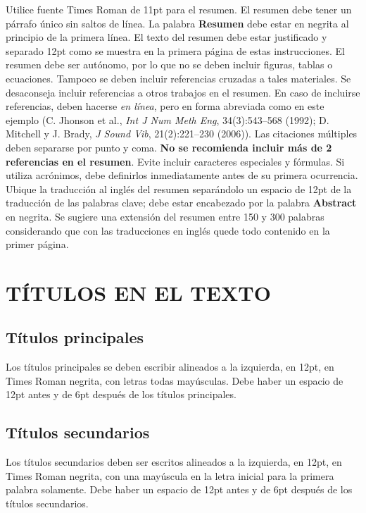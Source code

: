 \documentclass[oneside,a4paper,spanish,links]{amca}
\begin{document}
Utilice fuente Times Roman de 11pt para el resumen. El resumen
debe tener un párrafo único sin saltos de línea. La palabra
\textbf{Resumen} debe estar en negrita al principio de la primera
línea. El texto del resumen debe estar justificado y separado 12pt
como se muestra en la primera página de estas instrucciones. El
resumen debe ser autónomo, por lo que no se deben incluir figuras,
tablas o ecuaciones. Tampoco se deben incluir referencias cruzadas
a tales materiales. Se desaconseja incluir referencias a otros
trabajos en el resumen. En caso de incluirse referencias, deben
hacerse \emph{en línea}, pero en forma abreviada como en este
ejemplo (C. Jhonson et al., \emph{Int J Num Meth Eng},
34(3):543--568 (1992); D. Mitchell y J. Brady, \emph{J Sound Vib},
21(2):221--230 (2006)). Las citaciones múltiples deben separarse
por punto y coma. \textbf{No se recomienda incluir más de 2
referencias en el resumen}. Evite incluir caracteres especiales y
fórmulas. Si utiliza acrónimos, debe definirlos inmediatamente
antes de su primera ocurrencia. Ubique la traducción al inglés del
resumen separándolo un espacio de 12pt de la traducción de las
palabras clave; debe estar encabezado por la palabra
\textbf{Abstract} en negrita. Se sugiere una extensión del resumen
entre 150 y 300 palabras considerando que con las traducciones en
inglés quede todo contenido en la primer página.

\section{TÍTULOS EN EL TEXTO}

\subsection{Títulos principales}

Los títulos principales se deben escribir alineados a la
izquierda, en 12pt, en Times Roman negrita, con letras todas
mayúsculas. Debe haber un espacio de 12pt antes y de 6pt después
de los títulos principales.

\subsection{Títulos secundarios}

Los títulos secundarios deben ser escritos alineados a la
izquierda, en 12pt, en Times Roman negrita, con una mayúscula en
la letra inicial para la primera palabra solamente. Debe haber un
espacio de 12pt antes y de 6pt después de los títulos secundarios.
\end{document}
